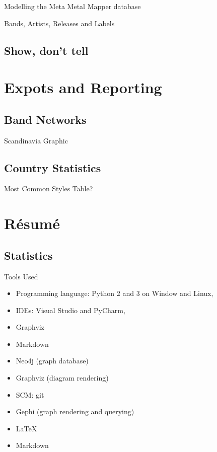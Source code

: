 \documentclass{beamer}
\begin{document}
    \begin{frame}{Modelling the Meta Metal Mapper database}
    
      Bands, Artists, Releases and Labels
    
    \end{frame}

  \subsection{Show, don't tell}


\section{Expots and Reporting}

  \subsection{Band Networks}

    \begin{frame}{Scandinavia}
      Graphic
    \end{frame}

  \subsection{Country Statistics}

    \begin{frame}{Most Common Styles}
      Table?
    \end{frame}

\section{Résumé}

  \subsection{Statistics}

    \begin{frame}{Tools Used}
      \begin{itemize}
        \item<1-> Programming language: Python 2 and 3 on Window and Linux,
        \item<1-> IDEs: Visual Studio and PyCharm,
        \item<1-> Graphviz
        \item<1-> Markdown
        \item<1-> Neo4j (graph database)
        \item<1-> Graphviz (diagram rendering)
        \item<1-> SCM: git
        \item<1-> Gephi (graph rendering and querying)
        \item<1-> \LaTeX{}
        \item<1-> Markdown
      \end{itemize}
    \end{frame}
    
\end{document}
